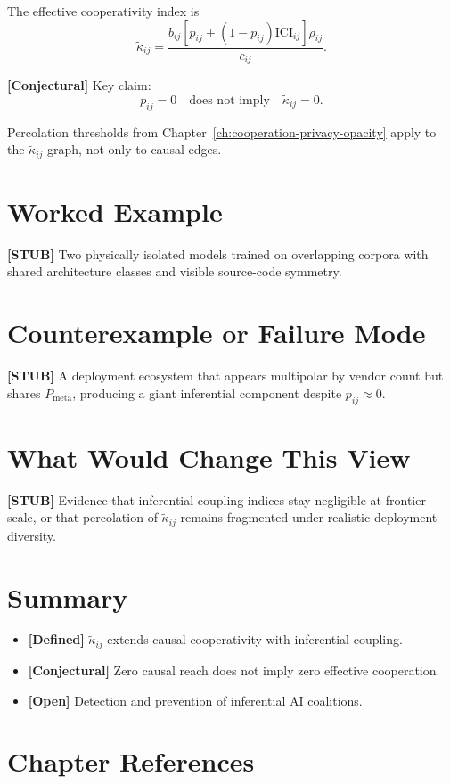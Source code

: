 The effective cooperativity index is
\[
\tilde{\kappa}_{ij}
=
\frac{
b_{ij}
\left[
p_{ij}+(1-p_{ij})\mathrm{ICI}_{ij}
\right]
\rho_{ij}
}{
c_{ij}
}.
\]

\textbf{[Conjectural]} Key claim:
\[
p_{ij}=0
\quad\text{does not imply}\quad
\tilde{\kappa}_{ij}=0.
\]



Percolation thresholds from Chapter~\ref{ch:cooperation-privacy-opacity} apply to the $\tilde{\kappa}_{ij}$ graph, not only to causal edges.

\section{Worked Example}

\textbf{[STUB]} Two physically isolated models trained on overlapping corpora with shared architecture classes and visible source-code symmetry.

\section{Counterexample or Failure Mode}

\textbf{[STUB]} A deployment ecosystem that appears multipolar by vendor count but shares $P_{\text{meta}}$, producing a giant inferential component despite $p_{ij}\approx 0$.

\section{What Would Change This View}

\textbf{[STUB]} Evidence that inferential coupling indices stay negligible at frontier scale, or that percolation of $\tilde{\kappa}_{ij}$ remains fragmented under realistic deployment diversity.

\section{Summary}

\begin{itemize}
  \item \textbf{[Defined]} $\tilde{\kappa}_{ij}$ extends causal cooperativity with inferential coupling.
  \item \textbf{[Conjectural]} Zero causal reach does not imply zero effective cooperation.
  \item \textbf{[Open]} Detection and prevention of inferential AI coalitions.
\end{itemize}

\section*{Chapter References}

